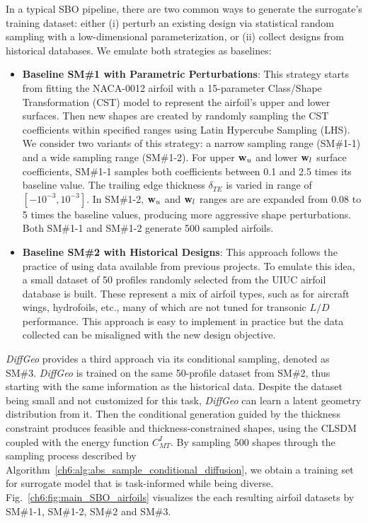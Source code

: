 In a typical SBO pipeline, there are two common ways to generate the surrogate’s training dataset: either (i) perturb an existing design via statistical random sampling with a low-dimensional parameterization, or (ii) collect designs from historical databases. We emulate both strategies as baselines:
\begin{itemize}
    \item \textbf{Baseline SM\#1 with Parametric Perturbations}: This strategy starts from fitting the NACA-0012 airfoil with a 15-parameter Class/Shape Transformation (CST) model to represent the airfoil’s upper and lower surfaces. Then new shapes are created by randomly sampling the CST coefficients within specified ranges using Latin Hypercube Sampling (LHS). We consider two variants of this strategy: a narrow sampling range (SM\#1-1) and a wide sampling range (SM\#1-2). For upper $\mathbf{w}_u$ and lower $\mathbf{w}_l$ surface coefficients, SM\#1-1 samples both coefficients between 0.1 and 2.5 times its baseline value. The trailing edge thickness $\delta_{TE}$ is varied in range of $[-10^{-3}, 10^{-3}]$. In SM\#1-2, $\mathbf{w}_u$ and $\mathbf{w}_l$ ranges are are expanded from 0.08 to 5 times the baseline values, producing more aggressive shape perturbations. Both SM\#1-1 and SM\#1-2 generate 500 sampled airfoils.

    \item \textbf{Baseline SM\#2 with Historical Designs}: This approach follows the practice of using data available from previous projects. To emulate this idea, a small dataset of 50 profiles randomly selected from the UIUC airfoil database is built. These represent a mix of airfoil types, such as for aircraft wings, hydrofoils, etc., many of which are not tuned for transonic $L/D$ performance. This approach is easy to implement in practice but the data collected can be misaligned with the new design objective. 
\end{itemize}

\textit{DiffGeo} provides a third approach via its conditional sampling, denoted as SM\#3. \textit{DiffGeo} is trained on the same 50-profile dataset from SM\#2, thus starting with the same information as the historical data. Despite the dataset being small and not customized for this task, \textit{DiffGeo} can learn a latent geometry distribution from it. Then the conditional generation guided by the thickness constraint produces feasible and thickness-constrained shapes, using the CLSDM coupled with the energy function $C^I_{MT}$. By sampling 500 shapes through the sampling process described by Algorithm~\ref{ch6:alg:abs_sample_conditional_diffusion}, we obtain a training set for surrogate model that is task-informed while being diverse. Fig.~\ref{ch6:fig:main_SBO_airfoils} visualizes the each resulting airfoil datasets by SM\#1-1, SM\#1-2, SM\#2 and SM\#3.

